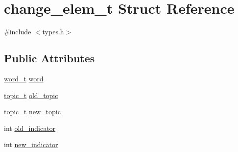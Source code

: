 \hypertarget{structchange__elem__t}{
\section{change\_\-elem\_\-t Struct Reference}
\label{structchange__elem__t}
}


{\ttfamily \#include $<$types.h$>$}

\subsection*{Public Attributes}
\begin{DoxyCompactItemize}
\item 
\hyperlink{types_8h_a95ae98ce8e71afc81beb9824c4b4505d}{word\_\-t} \hyperlink{structchange__elem__t_aacc97b4273a214c5becfd36a9b1fb6ba}{word}
\item 
\hyperlink{types_8h_a9e01813fe10a57a4b90b62ce9bab6433}{topic\_\-t} \hyperlink{structchange__elem__t_a4a2546b42874bf0220340406d2652da8}{old\_\-topic}
\item 
\hyperlink{types_8h_a9e01813fe10a57a4b90b62ce9bab6433}{topic\_\-t} \hyperlink{structchange__elem__t_afc01a4efa96662c47003ecdbb26abfa0}{new\_\-topic}
\item 
int \hyperlink{structchange__elem__t_a4bb5251a732bbaf458568bae6e07462c}{old\_\-indicator}
\item 
int \hyperlink{structchange__elem__t_ae4bdf198d3b7613de320e1feb6bf308f}{new\_\-indicator}
\end{DoxyCompactItemize}


